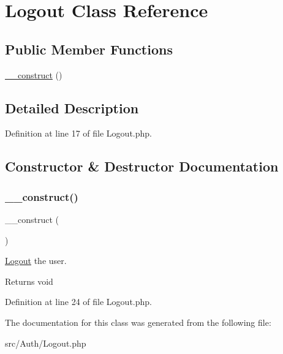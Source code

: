 \hypertarget{class_zest_1_1_auth_1_1_logout}{}\section{Logout Class Reference}
\label{class_zest_1_1_auth_1_1_logout}
\subsection*{Public Member Functions}
\begin{DoxyCompactItemize}
\item 
\mbox{\hyperlink{class_zest_1_1_auth_1_1_logout_a095c5d389db211932136b53f25f39685}{\+\_\+\+\_\+construct}} ()
\end{DoxyCompactItemize}


\subsection{Detailed Description}


Definition at line 17 of file Logout.\+php.



\subsection{Constructor \& Destructor Documentation}
\mbox{\label{class_zest_1_1_auth_1_1_logout_a095c5d389db211932136b53f25f39685}} 
\subsubsection{\texorpdfstring{\+\_\+\+\_\+construct()}{\_\_construct()}}
{\footnotesize\ttfamily \+\_\+\+\_\+construct (\begin{DoxyParamCaption}{ }\end{DoxyParamCaption})}

\mbox{\hyperlink{class_zest_1_1_auth_1_1_logout}{Logout}} the user.

\begin{DoxyReturn}{Returns}
void 
\end{DoxyReturn}


Definition at line 24 of file Logout.\+php.



The documentation for this class was generated from the following file\+:\begin{DoxyCompactItemize}
\item 
src/\+Auth/Logout.\+php\end{DoxyCompactItemize}
